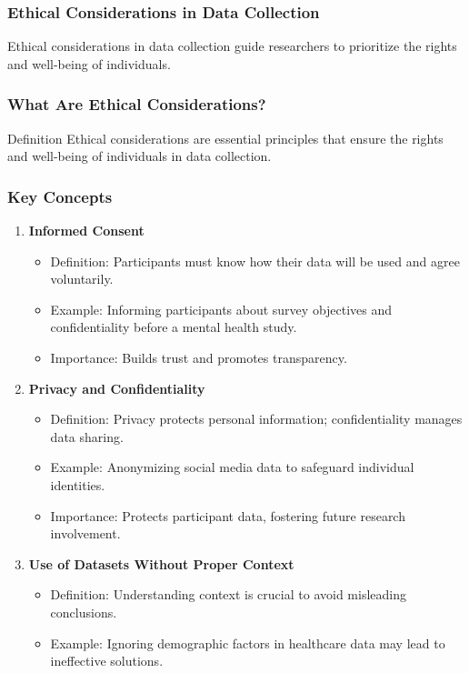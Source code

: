 \documentclass[aspectratio=169]{beamer}
\begin{document}
\begin{frame}[fragile]
    \frametitle{Ethical Considerations in Data Collection}
    Ethical considerations in data collection guide researchers to prioritize the rights and well-being of individuals.
\end{frame}

\begin{frame}[fragile]
    \frametitle{What Are Ethical Considerations?}
    \begin{block}{Definition}
        Ethical considerations are essential principles that ensure the rights and well-being of individuals in data collection.
    \end{block}
\end{frame}

\begin{frame}[fragile]
    \frametitle{Key Concepts}
    
    \begin{enumerate}
        \item \textbf{Informed Consent}
        \begin{itemize}
            \item Definition: Participants must know how their data will be used and agree voluntarily.
            \item Example: Informing participants about survey objectives and confidentiality before a mental health study.
            \item Importance: Builds trust and promotes transparency.
        \end{itemize}

        \item \textbf{Privacy and Confidentiality}
        \begin{itemize}
            \item Definition: Privacy protects personal information; confidentiality manages data sharing.
            \item Example: Anonymizing social media data to safeguard individual identities.
            \item Importance: Protects participant data, fostering future research involvement.
        \end{itemize}

        \item \textbf{Use of Datasets Without Proper Context}
        \begin{itemize}
            \item Definition: Understanding context is crucial to avoid misleading conclusions.
            \item Example: Ignoring demographic factors in healthcare data may lead to ineffective solutions.
        \end{itemize}
    \end{enumerate}
\end{frame}
\end{document}
